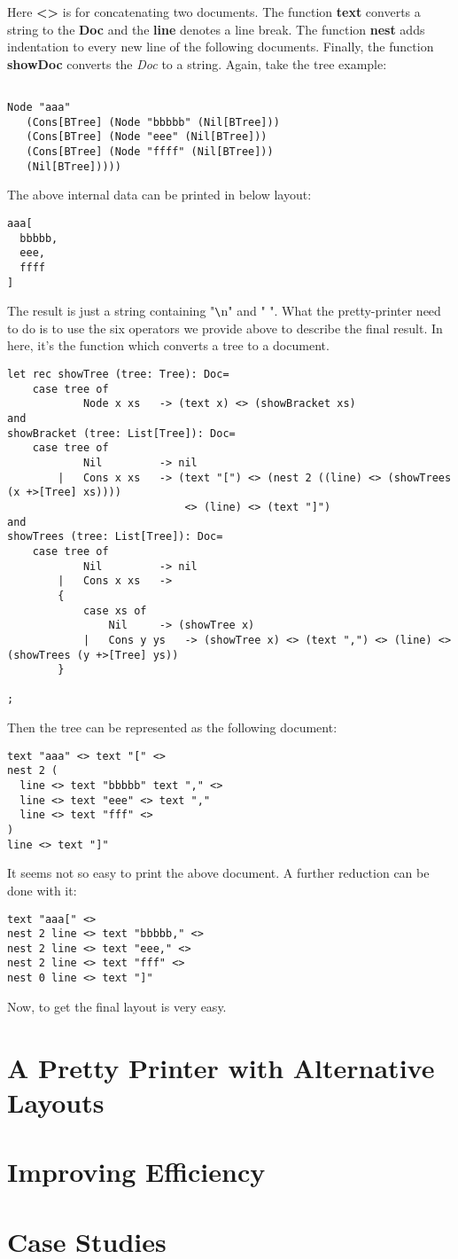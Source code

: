 Here \textbf{<>} is for concatenating two documents. The function \textbf{text} converts a string to the \textbf{Doc} and the \textbf{line} denotes a line break. The function \textbf{nest} adds indentation to every new line of the following documents. Finally, the function \textbf{showDoc} converts the \textit{Doc} to a string. Again, take the tree example:

\begin{lstlisting}

Node "aaa"
   (Cons[BTree] (Node "bbbbb" (Nil[BTree]))
   (Cons[BTree] (Node "eee" (Nil[BTree]))
   (Cons[BTree] (Node "ffff" (Nil[BTree]))
   (Nil[BTree]))))

\end{lstlisting}

The above internal data can be printed in below layout:

\begin{lstlisting}
aaa[
  bbbbb,
  eee,
  ffff
]
\end{lstlisting}

The result is just a string containing "\verb|\|n" and " ". What the pretty-printer need to do is to use the six operators we provide above to describe the final result. In here, it's the function which converts a tree to a document.

\begin{lstlisting}
let rec showTree (tree: Tree): Doc=
	case tree of
			Node x xs	-> (text x) <> (showBracket xs)
and
showBracket (tree: List[Tree]): Doc=
	case tree of
			Nil 		-> nil
		|	Cons x xs	-> (text "[") <> (nest 2 ((line) <> (showTrees (x +>[Tree] xs))))
							<> (line) <> (text "]")
and
showTrees (tree: List[Tree]): Doc=
	case tree of
			Nil 		-> nil
		|	Cons x xs	->
		{
			case xs of
				Nil		-> (showTree x)
			|	Cons y ys	-> (showTree x) <> (text ",") <> (line) <> (showTrees (y +>[Tree] ys))
		}

;
\end{lstlisting}
Then the tree can be represented as the following document:
\begin{lstlisting}
text "aaa" <> text "[" <>
nest 2 (
  line <> text "bbbbb" text "," <>
  line <> text "eee" <> text ","
  line <> text "fff" <>
)
line <> text "]"
\end{lstlisting}
It seems not so easy to print the above document. A further reduction can be done with it:
\begin{lstlisting}
text "aaa[" <>
nest 2 line <> text "bbbbb," <>
nest 2 line <> text "eee," <>
nest 2 line <> text "fff" <>
nest 0 line <> text "]"
\end{lstlisting}
Now, to get the final layout is very easy.

\section{A Pretty Printer with Alternative Layouts}




\section{Improving Efficiency}



\section{Case Studies}




